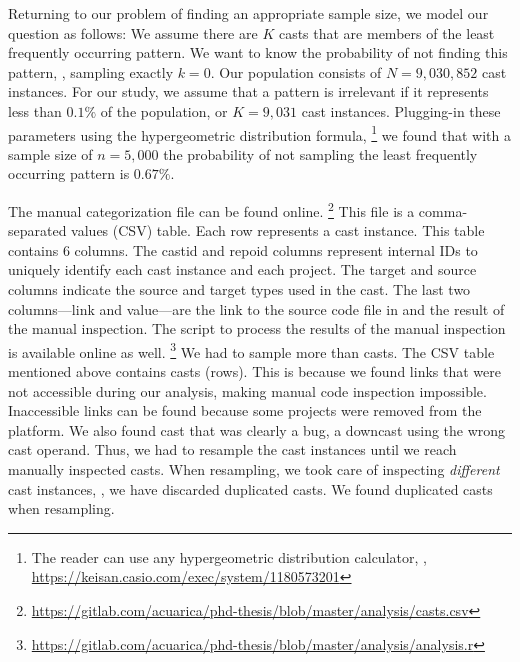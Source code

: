 Returning to our problem of finding an appropriate sample size, we model our question as follows:
We assume there are $K$ casts that are members of the least frequently occurring pattern.
We want to know the probability of not finding this pattern, \ie, sampling exactly $k = 0$.
Our population consists of $N = 9,030,852$ cast instances.
For our study, we assume that a pattern is irrelevant if it represents less than $0.1\%$ of the population, or $K = 9,031$ cast instances.
Plugging-in these parameters using the hypergeometric distribution formula,%
\footnote{The reader can use any hypergeometric distribution calculator, \eg{}, \url{https://keisan.casio.com/exec/system/1180573201}}
we found that with a sample size of $n = 5,000$ the probability of not sampling the
least frequently occurring pattern is $0.67\%$.

\newcommand\col[1]{\textsf{#1}}
The manual categorization file can be found online.%
\footnote{\url{https://gitlab.com/acuarica/phd-thesis/blob/master/analysis/casts.csv}}
This file is a comma-separated values (CSV) table.
Each row represents a cast instance.
This table contains 6 columns.
The \col{castid} and \col{repoid} columns represent internal IDs to uniquely identify each cast instance and each project.
The \col{target} and \col{source} columns indicate the source and target types used in the cast.
The last two columns---\col{link} and \col{value}---are the link to the source code file in \lgtm{} and the result of the manual inspection.
The script to process the results of the manual inspection is available online as well.%
\footnote{\url{https://gitlab.com/acuarica/phd-thesis/blob/master/analysis/analysis.r}}
We had to sample more than \nSize{} casts.
The CSV table mentioned above contains \nSeen{} casts (rows).
This is because we found \nBrokenLink{} links that were not accessible during our analysis,
making manual code inspection impossible.
Inaccessible links can be found because some projects were removed from the \lgtm{} platform.
We also found \nBug{} cast that was clearly a bug,
a downcast using the wrong cast operand.
Thus, we had to resample the cast instances until we reach \nSize{} manually inspected casts.
When resampling, we took care of inspecting \emph{different} cast instances, \ie{},
we have discarded duplicated casts.
We found \nDuplicated{} duplicated casts when resampling.
